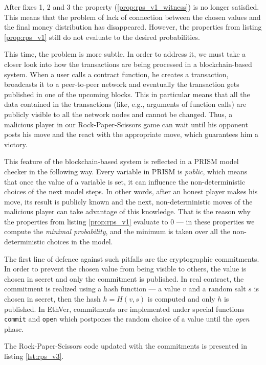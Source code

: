 After fixes 1, 2 and 3 the property (\ref{prop:rps_v1_witness}) is no longer satisfied.
This means that the problem of lack of connection between the chosen values and the final money distribution
has disappeared.
However, the properties from listing \ref{prop:rps_v1} still do not evaluate to the desired probabilities.

This time, the problem is more subtle.
In order to address it, we must take a closer look into how the transactions are being processed
in a blockchain-based system.
When a user calls a contract function, he creates a transaction, broadcasts it to a peer-to-peer network and 
eventually the transaction gets published in one of the upcoming blocks.
This in particular means that all the data contained in the transactions (like, e.g., arguments of function calls)
are publicly visible to all the network nodes and cannot be changed.
Thus, a malicious player in our Rock-Paper-Scissors game can wait until his opponent posts his move and 
the react with the appropriate move, which guarantees him a victory.

This feature of the blockchain-based system is reflected in a PRISM model checker in the following way.
Every variable in PRISM is \emph{public}, which means that once the value of a variable is set, it can influence
the non-deterministic choices of the next model steps.
In other words, after an honest player makes his move, its result is publicly known and the next, non-deterministic
moves of the malicious player can take advantage of this knowledge.
That is the reason why the properties from listing \ref{prop:rps_v1} evaluate to 0 --- in these properties we compute the
\emph{minimal probability}, and the minimum is taken over all the non-deterministic choices in the model.

The first line of defence against such pitfalls are the cryptographic commitments.
In order to prevent the chosen value from being visible to others, the value is chosen in secret and only
the commitment is published.
In real contract, the commitment is realized using a hash function --- a value $v$ and a random salt $s$ is chosen
in secret, then the hash $h = H(v, s)$ is computed and only $h$ is published.
In EthVer, commitments are implemented under special functions \lstinline{commit} and \lstinline{open} which
postpones the random choice of a value until the \emph{open} phase.

The Rock-Paper-Scissors code updated with the commitments is presented in listing \ref{lst:rps_v3}.

